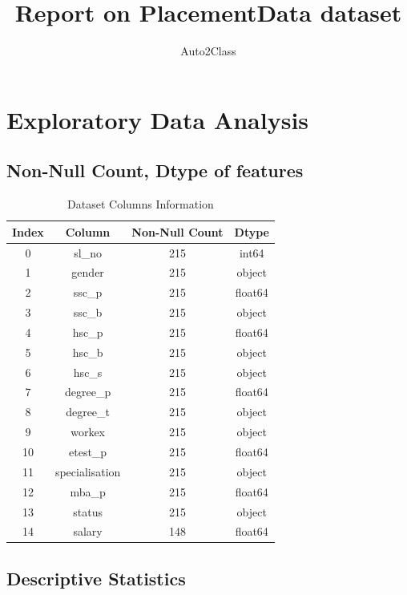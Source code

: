 \documentclass{article}%
\title{Report on PlacementData dataset}%
\author{Auto2Class}%
\begin{document}
%
\normalsize%
\maketitle%
\newpage%
\tableofcontents%
\newpage%
\section{Exploratory Data Analysis}%
\label{sec:ExploratoryDataAnalysis}%
\subsection{Non{-}Null Count, Dtype of features}%
\label{subsec:Non{-}NullCount,Dtypeoffeatures}%


\begin{table}[h!]%
\caption{Dataset Columns Information}%
\vspace{0.2cm}%
\centering%
\begin{tabular}{|c||c||c||c|}%
\hline%
Index&Column&Non{-}Null Count&Dtype\\%
\hline%
0&sl\_no&215&int64\\%
1&gender&215&object\\%
2&ssc\_p&215&float64\\%
3&ssc\_b&215&object\\%
4&hsc\_p&215&float64\\%
5&hsc\_b&215&object\\%
6&hsc\_s&215&object\\%
7&degree\_p&215&float64\\%
8&degree\_t&215&object\\%
9&workex&215&object\\%
10&etest\_p&215&float64\\%
11&specialisation&215&object\\%
12&mba\_p&215&float64\\%
13&status&215&object\\%
14&salary&148&float64\\%
\hline%
\end{tabular}%
\end{table}

%
\subsection{Descriptive Statistics}%
\label{subsec:DescriptiveStatistics}%
\end{document}
